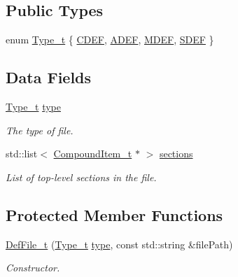\subsection*{Public Types}
\begin{DoxyCompactItemize}
\item 
enum \hyperlink{structparse_tree_1_1_def_file__t_aa42900de624d5b7fbad1d4dacc3d9f88}{Type\+\_\+t} \{ \hyperlink{structparse_tree_1_1_def_file__t_aa42900de624d5b7fbad1d4dacc3d9f88ad215e71d1d28976ac86e65b04c32554c}{C\+D\+EF}, 
\hyperlink{structparse_tree_1_1_def_file__t_aa42900de624d5b7fbad1d4dacc3d9f88abbd7274f16d8e4c074075be74c254b51}{A\+D\+EF}, 
\hyperlink{structparse_tree_1_1_def_file__t_aa42900de624d5b7fbad1d4dacc3d9f88a32ce54a6b8f15edb891bb336d501b1e0}{M\+D\+EF}, 
\hyperlink{structparse_tree_1_1_def_file__t_aa42900de624d5b7fbad1d4dacc3d9f88aeb70c3824feca827729ebf3b2ba1c94c}{S\+D\+EF}
 \}
\end{DoxyCompactItemize}
\subsection*{Data Fields}
\begin{DoxyCompactItemize}
\item 
\hyperlink{structparse_tree_1_1_def_file__t_aa42900de624d5b7fbad1d4dacc3d9f88}{Type\+\_\+t} \hyperlink{structparse_tree_1_1_def_file__t_abb3379281edf9791898e2bd4e0102a92}{type}
\begin{DoxyCompactList}\small\item\em The type of file. \end{DoxyCompactList}\item 
std\+::list$<$ \hyperlink{structparse_tree_1_1_compound_item__t}{Compound\+Item\+\_\+t} $\ast$ $>$ \hyperlink{structparse_tree_1_1_def_file__t_a70a178ace472d913cad486a04108da0f}{sections}
\begin{DoxyCompactList}\small\item\em List of top-\/level sections in the file. \end{DoxyCompactList}\end{DoxyCompactItemize}
\subsection*{Protected Member Functions}
\begin{DoxyCompactItemize}
\item 
\hyperlink{structparse_tree_1_1_def_file__t_a8fbf5663f2d6bf19eba946e1ebaec5ff}{Def\+File\+\_\+t} (\hyperlink{structparse_tree_1_1_def_file__t_aa42900de624d5b7fbad1d4dacc3d9f88}{Type\+\_\+t} \hyperlink{structparse_tree_1_1_def_file__t_abb3379281edf9791898e2bd4e0102a92}{type}, const std\+::string \&file\+Path)
\begin{DoxyCompactList}\small\item\em Constructor. \end{DoxyCompactList}\end{DoxyCompactItemize}
